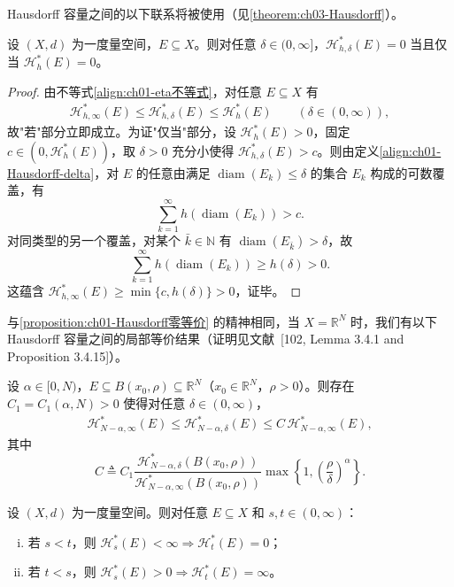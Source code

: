 \documentclass[../../main.tex]{subfiles}%
\begin{document}
Hausdorff 容量之间的以下联系将被使用（见\cref{theorem:ch03-Hausdorff}）。

\begin{proposition}\label{proposition:ch01-Hausdorff零等价}
设 $(X,d)$ 为一度量空间，$E\subseteq X$。则对任意 $\delta\in(0,\infty]$，$\mathcal{H}_{h,\delta}^*(E)=0$ 当且仅当 $\mathcal{H}_h^*(E)=0$。
\end{proposition}

\begin{proof}
由不等式\eqref{align:ch01-eta不等式}，对任意 $E\subseteq X$ 有
\begin{align}
\mathcal{H}_{h,\infty}^*(E)\leqslant\mathcal{H}_{h,\delta}^*(E)\leqslant\mathcal{H}_h^*(E)\qquad(\delta\in(0,\infty)), \label{align:ch01-Hausdorff零等价1}
\end{align}
故"若"部分立即成立。为证"仅当"部分，设 $\mathcal{H}_h^*(E)>0$，固定 $c\in(0,\mathcal{H}_h^*(E))$，取 $\delta>0$ 充分小使得 $\mathcal{H}_{h,\delta}^*(E)>c$。则由定义\eqref{align:ch01-Hausdorff-delta}，对 $E$ 的任意由满足 $\operatorname{diam}(E_k)\leqslant\delta$ 的集合 $E_k$ 构成的可数覆盖，有
\[
\sum_{k=1}^\infty h(\operatorname{diam}(E_k))>c.
\]
对同类型的另一个覆盖，对某个 $\bar{k}\in\mathbb{N}$ 有 $\operatorname{diam}(E_{\bar{k}})>\delta$，故
\[
\sum_{k=1}^\infty h(\operatorname{diam}(E_k))\geqslant h(\delta)>0.
\]
这蕴含 $\mathcal{H}_{h,\infty}^*(E)\geqslant\min\{c,h(\delta)\}>0$，证毕。
\end{proof}

与\cref{proposition:ch01-Hausdorff零等价} 的精神相同，当 $X=\mathbb{R}^N$ 时，我们有以下 Hausdorff 容量之间的局部等价结果（证明见文献~[102, Lemma 3.4.1 and Proposition 3.4.15]）。

\begin{proposition}\label{proposition:ch01-Hausdorff局部等价}
设 $\alpha\in[0,N)$，$E\subseteq B(x_0,\rho)\subseteq\mathbb{R}^N$（$x_0\in\mathbb{R}^N$，$\rho>0$）。则存在 $C_1=C_1(\alpha,N)>0$ 使得对任意 $\delta\in(0,\infty)$，
\begin{align}
\mathcal{H}_{N-\alpha,\infty}^*(E)\leqslant\mathcal{H}_{N-\alpha,\delta}^*(E)\leqslant C\,\mathcal{H}_{N-\alpha,\infty}^*(E), \label{align:ch01-Hausdorff局部等价}
\end{align}
其中
\[
C\triangleq C_1\frac{\mathcal{H}_{N-\alpha,\delta}^*(B(x_0,\rho))}{\mathcal{H}_{N-\alpha,\infty}^*(B(x_0,\rho))}
\max\left\{1,\left(\frac{\rho}{\delta}\right)^\alpha\right\}.
\]
\end{proposition}

\begin{lemma}\label{lemma:ch01-Hausdorff维数二分}
设 $(X,d)$ 为一度量空间。则对任意 $E\subseteq X$ 和 $s,t\in(0,\infty)$：
\begin{enumerate}[(i)]
\item 若 $s<t$，则 $\mathcal{H}_s^*(E)<\infty\Rightarrow\mathcal{H}_t^*(E)=0$；
\item 若 $t<s$，则 $\mathcal{H}_s^*(E)>0\Rightarrow\mathcal{H}_t^*(E)=\infty$。
\end{enumerate}
\end{lemma}
\end{document}
